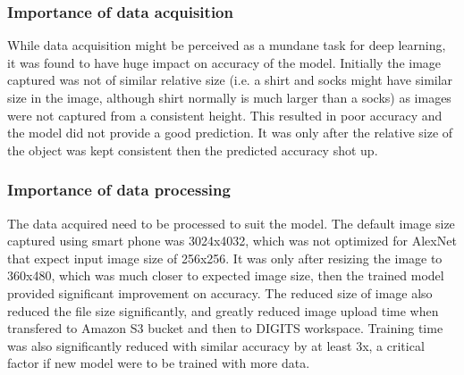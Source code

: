 \documentclass[10pt,journal,compsoc]{IEEEtran}
\begin{document}
\subsubsection{Importance of data acquisition}
While data acquisition might be perceived as a mundane task for deep learning, it was found to have huge impact on accuracy of the model.  Initially the image captured was not of similar relative size (i.e. a shirt and socks might have similar size in the image, although shirt normally is much larger than a socks) as images were not captured from a consistent height.  This resulted in poor accuracy and the model did not provide a good prediction.  It was only after the relative size of the object was kept consistent then the predicted accuracy shot up.

\subsubsection{Importance of data processing}
The data acquired need to be processed to suit the model. The default image size captured using smart phone was 3024x4032, which was not optimized for AlexNet that expect input image size of 256x256.  It was only after resizing the image to 360x480, which was much closer to expected image size, then the trained model provided significant improvement on accuracy.  The reduced size of image also reduced the file size significantly, and greatly reduced image upload time when transfered to Amazon S3 bucket and then to DIGITS workspace.  Training time was also significantly reduced with similar accuracy by at least 3x, a critical factor if new model were to be trained with more data.





\end{document}
